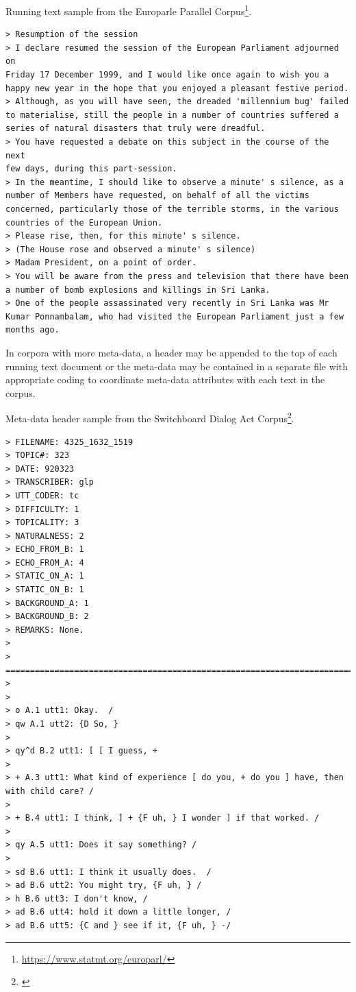 \documentclass[
  letterpaper,
]{scrbook}
\DeclareRobustCommand{\href}[2]{#2\footnote{\url{#1}}}
\begin{document}
Running text sample from the
\href{https://www.statmt.org/europarl/}{Europarle Parallel Corpus}.

\begin{verbatim}
> Resumption of the session
> I declare resumed the session of the European Parliament adjourned on
Friday 17 December 1999, and I would like once again to wish you a
happy new year in the hope that you enjoyed a pleasant festive period.
> Although, as you will have seen, the dreaded 'millennium bug' failed
to materialise, still the people in a number of countries suffered a
series of natural disasters that truly were dreadful.
> You have requested a debate on this subject in the course of the next
few days, during this part-session.
> In the meantime, I should like to observe a minute' s silence, as a
number of Members have requested, on behalf of all the victims
concerned, particularly those of the terrible storms, in the various
countries of the European Union.
> Please rise, then, for this minute' s silence.
> (The House rose and observed a minute' s silence)
> Madam President, on a point of order.
> You will be aware from the press and television that there have been
a number of bomb explosions and killings in Sri Lanka.
> One of the people assassinated very recently in Sri Lanka was Mr
Kumar Ponnambalam, who had visited the European Parliament just a few
months ago.
\end{verbatim}

In corpora with more meta-data, a header may be appended to the top of
each running text document or the meta-data may be contained in a
separate file with appropriate coding to coordinate meta-data attributes
with each text in the corpus.

Meta-data header sample from the \href{}{Switchboard Dialog Act Corpus}.

\begin{verbatim}
> FILENAME: 4325_1632_1519
> TOPIC#: 323
> DATE: 920323
> TRANSCRIBER: glp
> UTT_CODER: tc
> DIFFICULTY: 1
> TOPICALITY: 3
> NATURALNESS: 2
> ECHO_FROM_B: 1
> ECHO_FROM_A: 4
> STATIC_ON_A: 1
> STATIC_ON_B: 1
> BACKGROUND_A: 1
> BACKGROUND_B: 2
> REMARKS: None.
>
>
=========================================================================
>
>
> o A.1 utt1: Okay.  /
> qw A.1 utt2: {D So, }
>
> qy^d B.2 utt1: [ [ I guess, +
>
> + A.3 utt1: What kind of experience [ do you, + do you ] have, then
with child care? /
>
> + B.4 utt1: I think, ] + {F uh, } I wonder ] if that worked. /
>
> qy A.5 utt1: Does it say something? /
>
> sd B.6 utt1: I think it usually does.  /
> ad B.6 utt2: You might try, {F uh, } /
> h B.6 utt3: I don't know, /
> ad B.6 utt4: hold it down a little longer, /
> ad B.6 utt5: {C and } see if it, {F uh, } -/
\end{verbatim}
\end{document}
